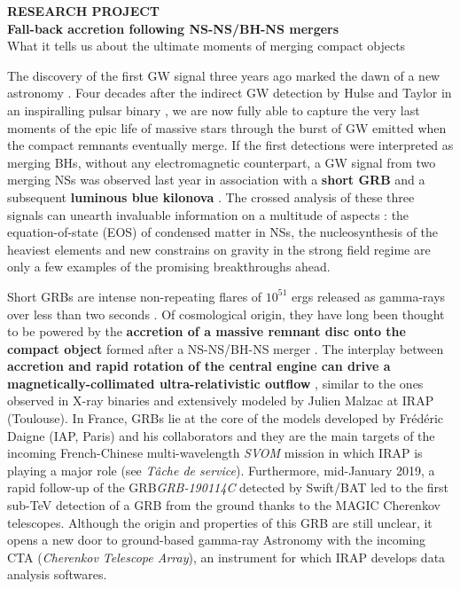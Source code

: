 \documentclass[11pt,onecolumn]{article}
\makeatletter
\newcommand{\gw}{GW\xspace}
\newcommand{\grb}{GRB\xspace}
\newcommand{\grbs}{GRBs\xspace}
\newcommand{\eos}{EOS\xspace}
\newcommand*{\ns}{NS\@\xspace}
\newcommand*{\nss}{NSs\@\xspace}
\newcommand*{\bh}{BH\@\xspace}
\newcommand*{\bhs}{BHs\@\xspace}
\makeatother
\begin{document}
\newpage

\vspace*{-1.2cm}
\begin{center}
\Large \textbf{RESEARCH PROJECT}\\
\vspace*{0.2cm}
\large \textbf{Fall-back accretion following \ns-\ns/\bh-\ns mergers}\\
What it tells us about the ultimate moments of merging compact objects  
\end{center}
\normalfont

The discovery of the first \gw signal three years ago marked the dawn of a new astronomy \citep{Abbott2016}. Four decades after the indirect \gw detection by Hulse and Taylor in an inspiralling pulsar binary \citep{Hulse1974}, we are now fully able to capture the very last moments of the epic life of massive stars through the burst of \gw emitted when the compact remnants eventually merge. If the first detections were interpreted as merging \bhs, without any electromagnetic counterpart, a \gw signal from two merging \nss was observed last year in association with a \textbf{short \grb} and a subsequent \textbf{luminous blue kilonova} \citep{TheLIGOScientificCollaboration2017}. The crossed analysis of these three signals can unearth invaluable information on a multitude of aspects : the equation-of-state (\eos) of condensed matter in \nss, the nucleosynthesis of the heaviest elements and new constrains on gravity in the strong field regime are only a few examples of the promising breakthroughs ahead.

Short \grbs are intense non-repeating flares of $10^{51}$ ergs released as gamma-rays over less than two seconds \citep{Berger2014}. Of cosmological origin, they have long been thought to be powered by the \textbf{accretion of a massive remnant disc onto the compact object} formed after a \ns-\ns/\bh-\ns merger \citep{Eichler1989}. The interplay between \textbf{accretion and rapid rotation of the central engine can drive a magnetically-collimated ultra-relativistic outflow} \citep{Piran2005}, similar to the ones observed in X-ray binaries and extensively modeled by Julien Malzac at IRAP (Toulouse). In France, \grbs lie at the core of the models developed by Fr\'ed\'eric Daigne (IAP, Paris) and his collaborators and they are the main targets of the incoming French-Chinese multi-wavelength \textit{SVOM} mission in which IRAP is playing a major role (see \textit{T\^{a}che de service}). Furthermore, mid-January 2019, a rapid follow-up of the \grb \textit{GRB-190114C} detected by Swift/BAT led to the first sub-TeV detection of a \grb from the ground thanks to the MAGIC Cherenkov telescopes. Although the origin and properties of this \grb are still unclear, it opens a new door to ground-based gamma-ray Astronomy with the incoming CTA (\textit{Cherenkov Telescope Array}), an instrument for which IRAP develops data analysis softwares.
\end{document}

